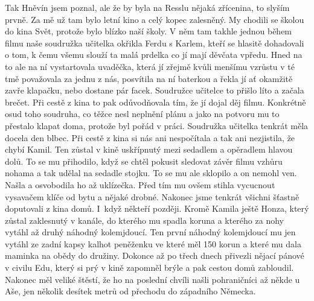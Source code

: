 
Tak Hněvín jsem poznal, ale že by byla na Resslu nějaká zřícenina, to
slyším prvně. Za mě už tam bylo letní kino a celý kopec zalesněný. My
chodili se školou do kina Svět, protože bylo blízko naší školy. V něm
tam takhle jednou během filmu naše soudružka učitelka okřikla Ferdu s
Karlem, kteří se hlasitě dohadovali o tom, k čemu všemu slouží ta malá
prdelka co jí mají děvčata vpředu. Hned na to ale na ní vystartovala
uvaděčka, která jí zřejmě kvůli menšímu vzrůstu v té tmě považovala za
jednu z nás, posvítila na ní baterkou a řekla jí ať okamžitě zavře
klapačku, nebo dostane pár facek. Soudružce učitelce to přišlo líto a
začala brečet. Při cestě z kina to pak odůvodňovala tím, že jí dojal
děj filmu. Konkrétně osud toho soudruha, co těžce nesl neplnění plánu
a jako na potvoru mu to přestalo klapat doma, protože byl pořád v
práci. Soudružka učitelka tenkrát měla docela den blbec. Při cestě z
kina si nás ani nespočítala a tak ani nezjistila, že chybí Kamil. Ten
zůstal v kině uskřípnutý mezi sedadlem a opěradlem hlavou dolů. To se
mu přihodilo, když se chtěl pokusit sledovat závěr filmu vzhůru nohama
a tak udělal na sedadle stojku. To se mu ale sklopilo a on nemohl ven.
Našla a osvobodila ho až uklízečka. Před tím mu ovšem stihla vycucnout
vysavačem klíče od bytu a nějaké drobné. Nakonec jsme tenkrát všichni
šťastně doputovali z kina domů. I~když někteří později. Kromě Kamila
ještě Honza, který zůstal zaklesnutý v kanále, do kterého mu spadla
koruna a kterého za nohy vytáhl až druhý náhodný kolemjdoucí. Ten
první náhodný kolemjdoucí mu jen vytáhl ze zadní kapsy kalhot
peněženku ve které měl 150 korun a které mu dala maminka na obědy do
družiny. Dokonce až po třech dnech přivezli nějací pánové v civilu
Edu, který si prý v kině zapomněl brýle a pak cestou domů zabloudil.
Nakonec měl veliké štěstí, že ho na poslední chvíli našli pohraničníci
až někde u Aše, jen několik desítek metrů od přechodu do západního
Německa.
